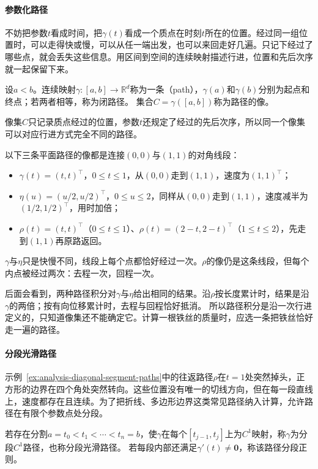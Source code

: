 \paragraph{参数化路径}

不妨把参数$t$看成时间，把$\gamma(t)$看成一个质点在时刻$t$所在的位置。经过同一组位置时，可以走得快或慢，可以从任一端出发，也可以来回走好几遍。只记下经过了哪些点，就会丢失这些信息。用区间到空间的连续映射描述行进，位置和先后次序就一起保留下来。
\begin{definition}[路径]
设$a<b$。连续映射$\gamma:[a,b]\to\mathbb R^d$称为一条（path），$\gamma(a)$和$\gamma(b)$分别为起点和终点；若两者相等，称为闭路径。
集合$C=\gamma([a,b])$称为路径的像。
\end{definition}

像集$C$只记录质点经过的位置，参数$t$还规定了经过的先后次序，所以同一个像集可以对应行进方式完全不同的路径。
\begin{example}[同一条对角线段上的三条路径]
\label{ex:analysis-diagonal-segment-paths}
以下三条平面路径的像都是连接$(0,0)$与$(1,1)$的对角线段：
\begin{itemize}
 \item $\gamma(t)=(t,t)^\top$，$0\leq t\leq1$，从$(0,0)$走到$(1,1)$，速度为$(1,1)^\top$；
 \item $\eta(u)=(u/2,u/2)^\top$，$0\leq u\leq2$，同样从$(0,0)$走到$(1,1)$，速度减半为$(1/2,1/2)^\top$，用时加倍；
 \item $\rho(t)=(t,t)^\top$（$0\leq t\leq1$）、$\rho(t)=(2-t,2-t)^\top$（$1\leq t\leq2$），先走到$(1,1)$再原路返回。
\end{itemize}
$\gamma$与$\eta$只是快慢不同，线段上每个点都恰好经过一次。$\rho$的像仍是这条线段，但每个内点被经过两次：去程一次，回程一次。
\end{example}

后面会看到，两种路径积分对$\gamma$与$\eta$给出相同的结果。沿$\rho$按长度累计时，结果是沿$\gamma$的两倍；按有向位移累计时，去程与回程恰好抵消。
所以路径积分是沿一次行进定义的，只知道像集还不能确定它。计算一根铁丝的质量时，应选一条把铁丝恰好走一遍的路径。

\paragraph{分段光滑路径}

示例~\ref{ex:analysis-diagonal-segment-paths}中的往返路径$\rho$在$t=1$处突然掉头，正方形的边界在四个角处突然转向。这些位置没有唯一的切线方向，但在每一段直线上，速度都存在且连续。为了把折线、多边形边界这类常见路径纳入计算，允许路径在有限个参数点处分段。
\begin{definition}[分段光滑路径]
若存在分割$a=t_0<t_1<\cdots<t_n=b$，使$\gamma$在每个$[t_{j-1},t_j]$上为$C^1$映射，称$\gamma$为分段$C^1$路径，也称分段光滑路径。
若每段内部还满足$\gamma'(t)\neq\bm0$，称该路径分段正则。
\end{definition}


